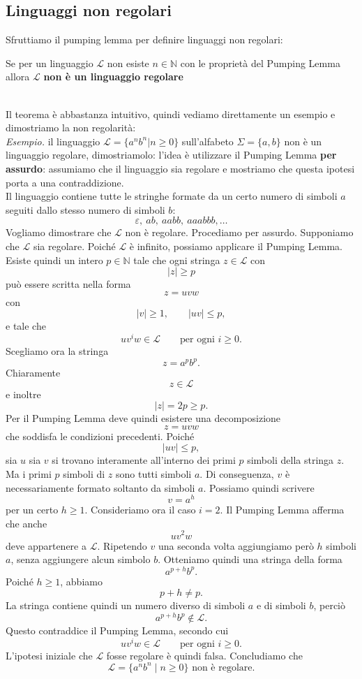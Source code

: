 \subsection{Linguaggi non regolari}
Sfruttiamo il pumping lemma per definire linguaggi non regolari:\smallskip\\
\colorbox{SALZO}{\parbox{\dimexpr\linewidth-2\fboxsep}{\begin{theorem}
    Se per un linguaggio $\mathcal{L}$ non esiste $n \in \mathbb{N}$ con le proprietà del Pumping Lemma allora $\mathcal{L}$ \textbf{non è un linguaggio regolare}
\end{theorem}}}\smallskip\\
Il teorema è abbastanza intuitivo, quindi vediamo direttamente un esempio e dimostriamo la non regolarità:\smallskip\\
\textit{Esempio.} il linguaggio $\mathcal{L} = \{  a^n b^n | n \ge 0   \}$ sull'alfabeto $\Sigma = \{ a,b  \}$ non è un linguaggio regolare, dimostriamolo: \label{dimostrazione}
l'idea è utilizzare il Pumping Lemma \textbf{per assurdo}: assumiamo che il linguaggio
sia regolare e mostriamo che questa ipotesi porta a una contraddizione.\smallskip\\
Il linguaggio contiene tutte le stringhe formate da un certo numero di simboli
$a$ seguiti dallo stesso numero di simboli $b$:
\[\varepsilon,\ ab,\ aabb,\ aaabbb,\ldots\]
Vogliamo dimostrare che $\mathcal{L}$ non è regolare.
Procediamo per assurdo.
Supponiamo che $\mathcal{L}$ sia regolare.
Poiché $\mathcal{L}$ è infinito, possiamo applicare il Pumping Lemma.
Esiste quindi un intero $p \in \mathbb{N}$ tale che ogni stringa
$z \in \mathcal{L}$ con
\[|z| \geq p\]
può essere scritta nella forma
\[z = uvw\]
con
\[|v| \geq 1,\qquad|uv| \leq p,\]
e tale che
\[uv^i w \in \mathcal{L}\qquad\text{per ogni } i \geq 0.\]
Scegliamo ora la stringa
\[z = a^p b^p.\]
Chiaramente
\[z \in \mathcal{L}\]
e inoltre
\[|z| = 2p \geq p.\]
Per il Pumping Lemma deve quindi esistere una decomposizione
\[z = uvw\]
che soddisfa le condizioni precedenti.
Poiché
\[|uv| \leq p,\]
sia $u$ sia $v$ si trovano interamente all'interno dei primi $p$ simboli
della stringa $z$.
Ma i primi $p$ simboli di $z$ sono tutti simboli $a$.
Di conseguenza, $v$ è necessariamente formato soltanto da simboli $a$.
Possiamo quindi scrivere
\[v = a^h\]
per un certo $h \geq 1$.
Consideriamo ora il caso $i=2$.
Il Pumping Lemma afferma che anche
\[uv^2w\]
deve appartenere a $\mathcal{L}$.
Ripetendo $v$ una seconda volta aggiungiamo però $h$ simboli $a$,
senza aggiungere alcun simbolo $b$.
Otteniamo quindi una stringa della forma
\[a^{p+h}b^p.\]
Poiché $h \geq 1$, abbiamo
\[p+h \neq p.\]
La stringa contiene quindi un numero diverso di simboli $a$ e di simboli $b$,
perciò
\[a^{p+h}b^p \notin \mathcal{L}.\]
Questo contraddice il Pumping Lemma, secondo cui
\[uv^i w \in \mathcal{L}\qquad\text{per ogni } i \geq 0.\]
L'ipotesi iniziale che $\mathcal{L}$ fosse regolare è quindi falsa.
Concludiamo che
\[\boxed{\mathcal{L} = \{a^n b^n \mid n \geq 0\}\text{ non è regolare.}}\]


